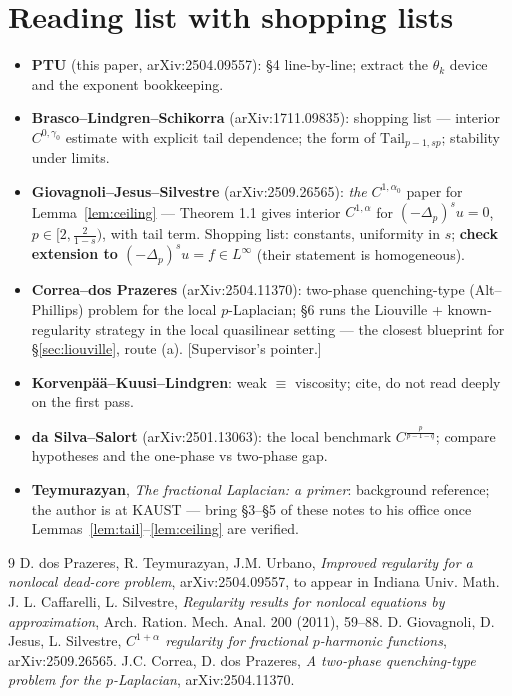 \documentclass[11pt]{amsart}
\theoremstyle{plain}
\theoremstyle{definition}
\theoremstyle{remark}
\newcommand{\fpl}[1]{(-\Delta_p)^{s}#1}            %
\newcommand{\al}{\alpha}
\newcommand{\Tail}{\mathrm{Tail}_{p-1,sp}}
\begin{document}
\section{Reading list with shopping lists}
\begin{itemize}
  \item \textbf{PTU} (this paper, arXiv:2504.09557): \S4 line-by-line;
        extract the $\theta_k$ device and the exponent bookkeeping.
  \item \textbf{Brasco--Lindgren--Schikorra} (arXiv:1711.09835):
        shopping list --- interior $C^{0,\gamma_0}$ estimate with explicit
        tail dependence; the form of $\Tail$; stability under limits.
  \item \textbf{Giovagnoli--Jesus--Silvestre} \cite{GJS}
        (arXiv:2509.26565): \emph{the} $C^{1,\al_0}$ paper for
        Lemma~\ref{lem:ceiling} --- Theorem 1.1 gives interior $C^{1,\al}$
        for $\fpl{u}=0$, $p\in[2,\frac{2}{1-s})$, with tail term.
        Shopping list: constants, uniformity in $s$;
        \textbf{check extension to $\fpl{u}=f\in L^\infty$}
        (their statement is homogeneous).
  \item \textbf{Correa--dos Prazeres} \cite{CP} (arXiv:2504.11370):
        two-phase quenching-type (Alt--Phillips) problem for the local
        $p$-Laplacian; \S6 runs the Liouville + known-regularity strategy
        in the local quasilinear setting --- the closest blueprint for
        \S\ref{sec:liouville}, route (a). [Supervisor's pointer.]
  \item \textbf{Korvenp\"a\"a--Kuusi--Lindgren}: weak $\equiv$ viscosity;
        cite, do not read deeply on the first pass.
  \item \textbf{da Silva--Salort} (arXiv:2501.13063): the local benchmark
        $C^{\frac{p}{p-1-q}}$; compare hypotheses and the one-phase vs
        two-phase gap.
  \item \textbf{Teymurazyan}, \emph{The fractional Laplacian: a primer}:
        background reference; the author is at KAUST --- bring \S3--\S5 of
        these notes to his office once Lemmas~\ref{lem:tail}--\ref{lem:ceiling}
        are verified.
\end{itemize}
\begin{thebibliography}{9}
 D. dos Prazeres, R. Teymurazyan, J.M. Urbano,
\emph{Improved regularity for a nonlocal dead-core problem},
arXiv:2504.09557, to appear in Indiana Univ. Math. J.
 L. Caffarelli, L. Silvestre,
\emph{Regularity results for nonlocal equations by approximation},
Arch. Ration. Mech. Anal. 200 (2011), 59--88.
 D. Giovagnoli, D. Jesus, L. Silvestre,
\emph{$C^{1+\alpha}$ regularity for fractional $p$-harmonic functions},
arXiv:2509.26565.
 J.C. Correa, D. dos Prazeres,
\emph{A two-phase quenching-type problem for the $p$-Laplacian},
arXiv:2504.11370.
\end{thebibliography}
\end{document}
